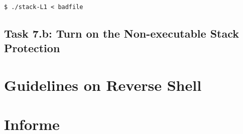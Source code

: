 \begin{lstlisting}
$ ./stack-L1 < badfile 
\end{lstlisting}
 

\subsection{Task 7.b: Turn on the Non-executable Stack Protection}




\section{Guidelines on Reverse Shell} 
\label{sec:guildelines}






\section{Informe}




